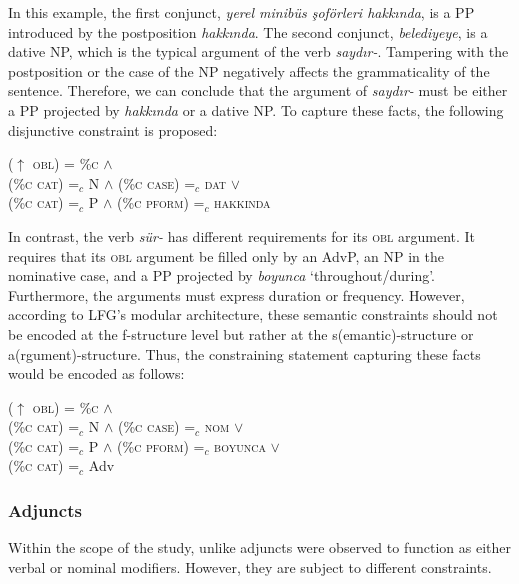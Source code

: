 In this example, the first conjunct, \textit{yerel minibüs şoförleri hakkında}, is a PP introduced by the postposition \textit{hakkında}. The second conjunct, \textit{belediyeye}, is a dative NP, which is the typical argument of the verb \textit{saydır-}. Tampering with the postposition or the case of the NP negatively affects the grammaticality of the sentence.  Therefore, we can conclude that the argument of \textit{saydır-} must be either a PP projected by \textit{hakkında} or a dative NP. To capture these facts, the following disjunctive constraint is proposed:

\ex
\label{saydir:statement}
($\uparrow$ \textsc{obl}) = \%\textsc{c} $\land$ \\
\vspace{3pt}\text{[[}(\%\textsc{c cat}) =$_c$ N $\land$ (\%\textsc{c case}) =$_c$ \textsc{dat}\text{]} $\lor$ \\
\text{[}(\%\textsc{c cat}) =$_c$ P $\land$ (\%\textsc{c pform}) =$_c$ \textsc{hakkinda}\text{]]}
\xe

In contrast, the verb \textit{sür-} has different requirements for its \textsc{obl} argument. It requires that its \textsc{obl} argument be filled only by an AdvP, an NP in the nominative case, and a PP projected by \textit{boyunca} `throughout/during'. Furthermore, the arguments must express duration or frequency. However, according to LFG's modular architecture, these semantic constraints should not be encoded at the f-structure level but rather at the s(emantic)-structure or a(rgument)-structure. Thus, the constraining statement capturing these facts would be encoded as follows:

\ex
\label{sur:statement}
($\uparrow$ \textsc{obl}) = \%\textsc{c} $\land$ \\
\vspace{3pt}\text{[[}(\%\textsc{c cat}) =$_c$ N $\land$ (\%\textsc{c case}) =$_c$ \textsc{nom}\text{]} $\lor$ \\
\text{[}(\%\textsc{c cat}) =$_c$ P $\land$ (\%\textsc{c pform}) =$_c$ \textsc{boyunca}\text{]} $\lor$ \\
(\%\textsc{c cat}) =$_c$ Adv\text{]}
\xe

\subsubsection{Adjuncts}

Within the scope of the study, unlike adjuncts were observed to function as either verbal or nominal modifiers. However, they are subject to different constraints.

